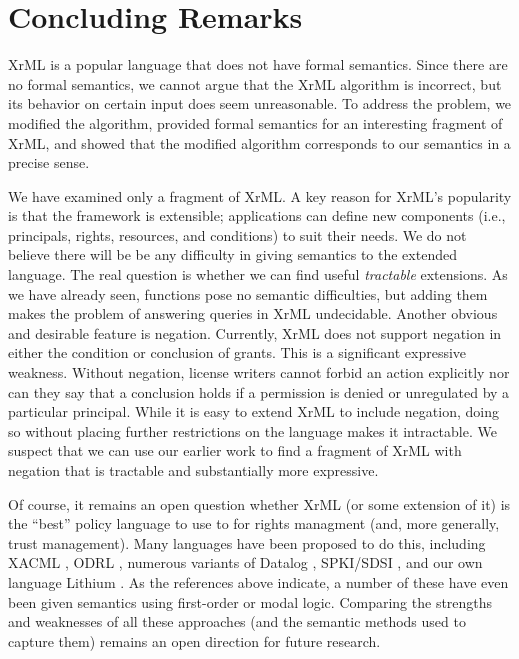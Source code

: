 \documentclass{acmtrans2m}
\newcommand{\<}{
}
\renewcommand{\>}{\rangle}
\begin{document}
\section{Concluding Remarks}\label{s:concl}
XrML is a popular language that does not have formal semantics.  Since there are no formal semantics,
we cannot argue that the XrML algorithm is incorrect, but its behavior on certain input does seem
unreasonable.  To address the problem, we modified the algorithm, provided formal semantics for
an interesting fragment of XrML,
and showed that the modified algorithm
corresponds to our semantics in a precise sense.


We have examined only a fragment of XrML.  A key reason for XrML's popularity is that the framework
is extensible; applications can define new components (i.e., principals, rights, resources, and
conditions) to suit their needs.  We do not believe there will be be any difficulty in giving
semantics to the extended language.  The real question is whether we can find useful {\em tractable\/}
extensions.  As we have already seen, functions pose no semantic difficulties, but adding them makes
the problem of answering queries in XrML undecidable.  Another obvious and desirable feature is
negation.  Currently, XrML does not support negation in either the condition or conclusion of grants.
This is a significant expressive weakness.  Without negation, license writers cannot forbid an action
explicitly nor can they say that a conclusion holds if a permission is denied or unregulated by a
particular principal.  While it is easy to extend XrML to include negation, doing so without placing
further restrictions on the language makes it intractable.  We suspect
that we can use our earlier
work \cite{HW03} to find a fragment of XrML with negation that is tractable and substantially more
expressive.

Of course, it remains an open question whether XrML (or some extension
of it) is the ``best'' policy language to use to for rights managment
(and, more generally, trust management).  Many
languages have been proposed to do this, including XACML \cite{XACML},
ODRL \cite{ODRL}, numerous variants of Datalog
\cite{DeT,LGF03,LMW,MS04,Tre}, SPKI/SDSI \cite{HM01a,LM06,spki1,spki2},
and our own language Lithium \cite{HW03}.
As the references above indicate, a number of these have even been given
semantics using first-order or modal logic.
Comparing the strengths and weaknesses of all these approaches (and the
semantic methods used to capture them) remains an open direction for
future research.
\end{document}
